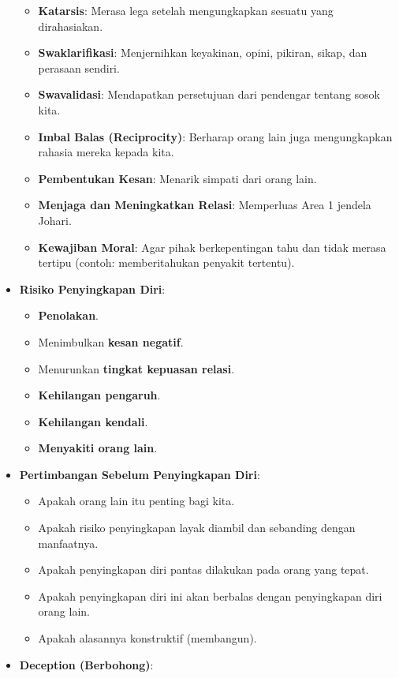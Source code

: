 \documentclass[
  letterpaper,
  DIV=11,
  numbers=noendperiod]{scrreprt}
\providecommand{\tightlist}{%
  \setlength{\itemsep}{0pt}\setlength{\parskip}{0pt}}
\begin{document}
\begin{itemize}
  \begin{itemize}
  \tightlist
  \item
    \textbf{Katarsis}: Merasa lega setelah mengungkapkan sesuatu yang
    dirahasiakan.
  \item
    \textbf{Swaklarifikasi}: Menjernihkan keyakinan, opini, pikiran,
    sikap, dan perasaan sendiri.
  \item
    \textbf{Swavalidasi}: Mendapatkan persetujuan dari pendengar tentang
    sosok kita.
  \item
    \textbf{Imbal Balas (Reciprocity)}: Berharap orang lain juga
    mengungkapkan rahasia mereka kepada kita.
  \item
    \textbf{Pembentukan Kesan}: Menarik simpati dari orang lain.
  \item
    \textbf{Menjaga dan Meningkatkan Relasi}: Memperluas Area 1 jendela
    Johari.
  \item
    \textbf{Kewajiban Moral}: Agar pihak berkepentingan tahu dan tidak
    merasa tertipu (contoh: memberitahukan penyakit tertentu).
  \end{itemize}
\item
  \textbf{Risiko Penyingkapan Diri}:

  \begin{itemize}
  \tightlist
  \item
    \textbf{Penolakan}.
  \item
    Menimbulkan \textbf{kesan negatif}.
  \item
    Menurunkan \textbf{tingkat kepuasan relasi}.
  \item
    \textbf{Kehilangan pengaruh}.
  \item
    \textbf{Kehilangan kendali}.
  \item
    \textbf{Menyakiti orang lain}.
  \end{itemize}
\item
  \textbf{Pertimbangan Sebelum Penyingkapan Diri}:

  \begin{itemize}
  \tightlist
  \item
    Apakah orang lain itu penting bagi kita.
  \item
    Apakah risiko penyingkapan layak diambil dan sebanding dengan
    manfaatnya.
  \item
    Apakah penyingkapan diri pantas dilakukan pada orang yang tepat.
  \item
    Apakah penyingkapan diri ini akan berbalas dengan penyingkapan diri
    orang lain.
  \item
    Apakah alasannya konstruktif (membangun).
  \end{itemize}
\item
  \textbf{Deception (Berbohong)}:


\end{itemize}
\end{document}
